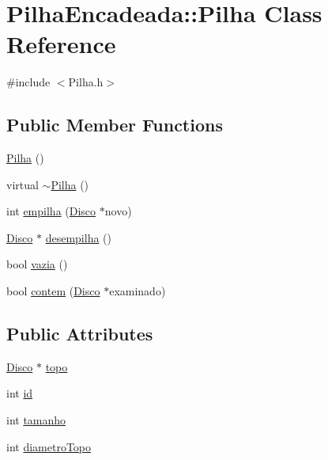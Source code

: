 \hypertarget{classPilhaEncadeada_1_1Pilha}{
\section{PilhaEncadeada::Pilha Class Reference}
\label{classPilhaEncadeada_1_1Pilha}
}


{\ttfamily \#include $<$Pilha.h$>$}

\subsection*{Public Member Functions}
\begin{DoxyCompactItemize}
\item 
\hyperlink{classPilhaEncadeada_1_1Pilha_a8839d40a55b4011f57dae2785db9dd20}{Pilha} ()
\item 
virtual \hyperlink{classPilhaEncadeada_1_1Pilha_ae2ff1464cc3b931a67f2d9f56ac96510}{$\sim$Pilha} ()
\item 
int \hyperlink{classPilhaEncadeada_1_1Pilha_a7790d2620d0852f24062a13f58a08539}{empilha} (\hyperlink{classPilhaEncadeada_1_1Disco}{Disco} $\ast$novo)
\item 
\hyperlink{classPilhaEncadeada_1_1Disco}{Disco} $\ast$ \hyperlink{classPilhaEncadeada_1_1Pilha_ac27948bfd84d7b98d38152bdc8f669e2}{desempilha} ()
\item 
bool \hyperlink{classPilhaEncadeada_1_1Pilha_ae4484368aedfccd43d2515466d6582f9}{vazia} ()
\item 
bool \hyperlink{classPilhaEncadeada_1_1Pilha_a1ced9a36db9090bc39d1f4da63884158}{contem} (\hyperlink{classPilhaEncadeada_1_1Disco}{Disco} $\ast$examinado)
\end{DoxyCompactItemize}
\subsection*{Public Attributes}
\begin{DoxyCompactItemize}
\item 
\hyperlink{classPilhaEncadeada_1_1Disco}{Disco} $\ast$ \hyperlink{classPilhaEncadeada_1_1Pilha_a061ad72a4dfdb0f0135c61d564801299}{topo}
\item 
int \hyperlink{classPilhaEncadeada_1_1Pilha_aae9cbeca741bf5ef1fbae7a6aba3ae64}{id}
\item 
int \hyperlink{classPilhaEncadeada_1_1Pilha_ae5b7e5d7daefb67f057320b4740444ab}{tamanho}
\item 
int \hyperlink{classPilhaEncadeada_1_1Pilha_ab826a0678ab53623c85b8fd3b0a2b993}{diametroTopo}
\end{DoxyCompactItemize}


